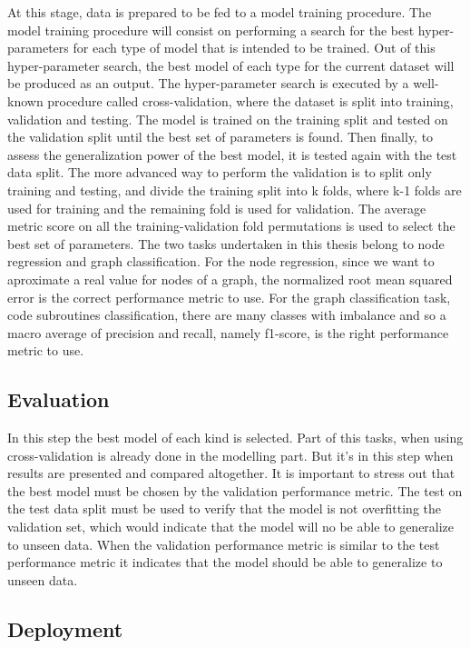 At this stage, data is prepared to be fed to a model training procedure. The model training procedure will consist on performing a search for the best hyper-parameters for each type of model that is intended to be trained. Out of this hyper-parameter search, the best model of each type for the current dataset will be produced as an output. 
The hyper-parameter search is executed by a well-known procedure called cross-validation, where the dataset is split into training, validation and testing. The model is trained on the training split and tested on the validation split until the best set of parameters is found. Then finally, to assess the generalization power of the best model, it is tested again with the test data split. 
The more advanced way to perform the validation is to split only training and testing, and divide the training split into k folds, where k-1 folds are used for training and the remaining fold is used for validation. The average metric score on all the training-validation fold permutations is used to select the best set of parameters.
The two tasks undertaken in this thesis belong to node regression and graph classification. For the node regression, since we want to aproximate a real value for nodes of a graph, the normalized root mean squared error is the correct performance metric to use.
 For the graph classification task, code subroutines classification, there are many classes with imbalance and so a macro average of precision and recall, namely f1-score, is the right performance metric to use.

\subsection{Evaluation}

In this step the best model of each kind is selected. Part of this tasks, when using cross-validation is already done in the modelling part. But it's in this step when results are presented and compared altogether. 
It is important to stress out that the best model must be chosen by the validation performance metric. The test on the test data split must be used to verify that the model is not overfitting the validation set, which would indicate that the model will no be able to generalize to unseen data. When the validation performance metric is similar to the test performance metric it indicates that the model should be able to generalize to unseen data.

\subsection{Deployment}

